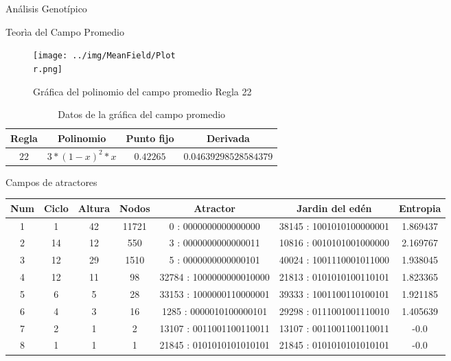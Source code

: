 \documentclass[12pt, letterpaper]{article}
\renewcommand{\rule}{Regla 22}
\renewcommand{\r}{22}
\begin{document}
  \begin{section}{Análisis Genotípico} 
  \begin{subsection}{Teorìa del Campo Promedio}
  \begin{figure}[H]
  \centering
  \texttt{[image: ../img/MeanField/Plot\\r.png]}
  \caption{Gráfica del polinomio del campo promedio \rule  }
  \end{figure}
  \begin{table}[H]
  \centering
  \begin{tabular}{|c|c|c|c|}
  \hline Regla & Polinomio  & Punto fijo &Derivada \\ 
  \hline $\r$ & $3*(1 - x)^2*x$  &  $0.42265$  & $0.04639298528584379$ \\  \hline 
  \end{tabular}
  \caption{Datos de la gráfica del campo promedio}
  \end{table}
  \end{subsection}
  \clearpage
  \clearpage
  \begin{subsection}{Campos de atractores}
  \begin{center}
    \begin{longtable}{|c|c|c|c||c|c||c|}
  \hline 
  Num & Ciclo & Altura &Nodos &  Atractor &  Jardin del edén  & Entropia \\ \endhead 
  \hline \hline    1 & 1 & 42 & 11721 & 0 : 0000000000000000   & 38145 : 1001010100000001  & 1.869437 \\ \hline 
  \hline \hline    2 & 14 & 12 & 550 & 3 : 0000000000000011   & 10816 : 0010101001000000  & 2.169767 \\ \hline 
  \hline \hline    3 & 12 & 29 & 1510 & 5 : 0000000000000101   & 40024 : 1001110001011000  & 1.938045 \\ \hline 
  \hline \hline    4 & 12 & 11 & 98 & 32784 : 1000000000010000   & 21813 : 0101010100110101  & 1.823365 \\ \hline 
  \hline \hline    5 & 6 & 5 & 28 & 33153 : 1000000110000001   & 39333 : 1001100110100101  & 1.921185 \\ \hline 
  \hline \hline    6 & 4 & 3 & 16 & 1285 : 0000010100000101   & 29298 : 0111001001110010  & 1.405639 \\ \hline 
  \hline \hline    7 & 2 & 1 & 2 & 13107 : 0011001100110011   & 13107 : 0011001100110011  & -0.0 \\ \hline 
  \hline \hline    8 & 1 & 1 & 1 & 21845 : 0101010101010101   & 21845 : 0101010101010101  & -0.0 \\ \hline 

\end{longtable}
\end{center}
\end{subsection}
\end{section}
\end{document}
